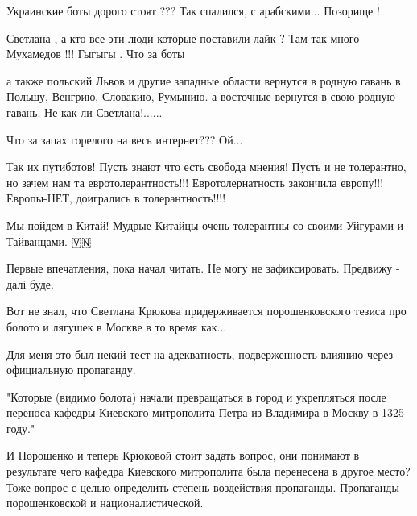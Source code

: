 \begin{itemize}
Украинские боты дорого стоят ??? Так спалился, с арабскими... Позорище !

 
Светлана , а кто все эти люди которые поставили лайк ? Там так много Мухамедов
!!! Гыгыгы . Что за боты


 

а также польский Львов и другие западные области вернутся в родную гавань в
Польшу, Венгрию, Словакию, Румынию. а восточные вернутся в свою родную гавань.
Не как ли Светлана!......

 

Что за запах горелого на весь интернет??? Ой...

Так их путиботов! Пусть знают что есть свобода мнения! Пусть и не толерантно,
но зачем нам та евротолерантность!!! Евротолернатность закончила европу!!!
Европы-НЕТ, доигрались в толерантность!!!!

Мы пойдем в Китай! Мудрые Китайцы очень толерантны со своими Уйгурами и
Тайванцами. 🇻🇳


Первые впечатления, пока начал читать. Не могу не зафиксировать. Предвижу -
далі буде.

Вот не знал, что Светлана Крюкова придерживается порошенковского тезиса про
болото и лягушек в Москве в то время как...

Для меня это был некий тест на адекватность, подверженность влиянию через
официальную пропаганду.

"Которые (видимо болота) начали превращаться в город и укрепляться после
переноса кафедры Киевского митрополита Петра из Владимира в Москву в 1325
году."

И Порошенко и теперь Крюковой стоит задать вопрос, они понимают в результате
чего кафедра Киевского митрополита была перенесена в другое место? Тоже вопрос
с целью определить степень воздействия пропаганды. Пропаганды порошенковской и
националистической.


\end{itemize}
